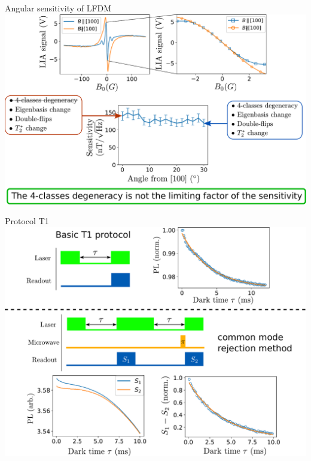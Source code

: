 \documentclass{beamer}
\begin{document}
\begin{frame}{Angular sensitivity of LFDM}
\centering
\includegraphics[width=\textwidth,height=0.85\textheight,keepaspectratio]{Slide_angular_sensitivity}
\end{frame}

\begin{frame}{Protocol T1}
\centering
\includegraphics[width=\textwidth,height=0.85\textheight,keepaspectratio]{Slide_T1_protocol}
\end{frame}
\end{document}
